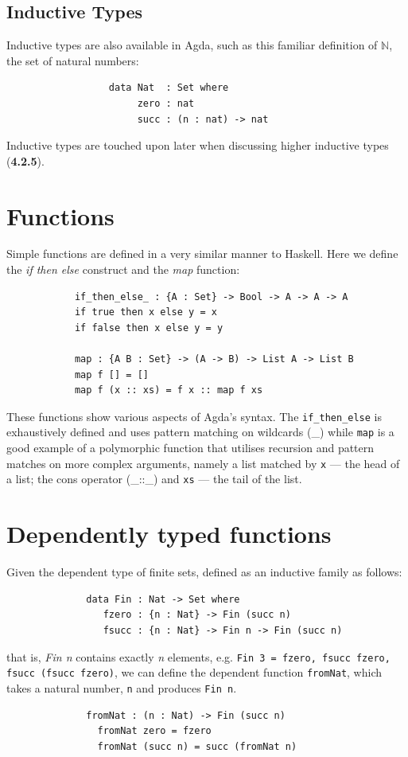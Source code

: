\documentclass[12pt]{report}
\begin{document}
\subsection{Inductive Types}
Inductive types are also available in Agda, such as this familiar definition of $\mathbb{N}$, the set of natural numbers:
\begin{verbatim}
                  data Nat  : Set where
                       zero : nat
                       succ : (n : nat) -> nat
\end{verbatim}
Inductive types are touched upon later when discussing higher inductive types (\textbf{4.2.5}).

\section{Functions}
Simple functions are defined in a very similar manner to Haskell. Here we define the \textit{if then else} construct and the \textit{map} function: 
\begin{verbatim}
            if_then_else_ : {A : Set} -> Bool -> A -> A -> A
            if true then x else y = x  
            if false then x else y = y
                        
            map : {A B : Set} -> (A -> B) -> List A -> List B
            map f [] = []
            map f (x :: xs) = f x :: map f xs        
\end{verbatim}
These functions show various aspects of Agda's syntax. The \texttt{if\_then\_else} is exhaustively defined and uses pattern matching on wildcards (\_) while \texttt{map} is a good example of a polymorphic function that utilises recursion and pattern matches on more complex arguments, namely a list matched by \texttt{x} --- the head of a list; the cons operator (\_::\_) and \texttt{xs} --- the tail of the list.

\section{Dependently typed functions}
Given the dependent type of finite sets, defined as an inductive family as follows:
\begin{verbatim}
              data Fin : Nat -> Set where
                 fzero : {n : Nat} -> Fin (succ n)
                 fsucc : {n : Nat} -> Fin n -> Fin (succ n)
\end{verbatim}
that is, \textit{Fin n} contains exactly \textit{n} elements, e.g. \texttt{Fin 3 = fzero, fsucc fzero, fsucc (fsucc fzero)}, we can define the dependent function \texttt{fromNat}, which takes a natural number, \texttt{n} and produces \texttt{Fin n}.
\begin{verbatim}
              fromNat : (n : Nat) -> Fin (succ n)
                fromNat zero = fzero  
                fromNat (succ n) = succ (fromNat n)
\end{verbatim}
\end{document}
